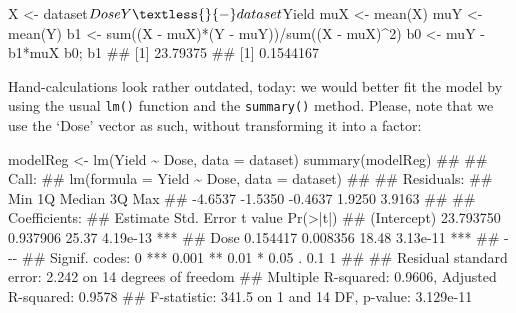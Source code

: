 \documentclass[a4paper,12pt,oneside]{book}
\newenvironment{Shaded}{\begin{snugshade}}{\end{snugshade}}
\newcommand{\DecValTok}[1]{#1}
\newcommand{\SpecialCharTok}[1]{#1}
\newcommand{\DocumentationTok}[1]{#1}
\newcommand{\OtherTok}[1]{#1}
\newcommand{\FunctionTok}[1]{#1}
\newcommand{\AttributeTok}[1]{#1}
\newcommand{\NormalTok}[1]{#1}
\begin{document}
\begin{Shaded}
\begin{Highlighting}[]
\NormalTok{X }\OtherTok{\textless{}{-}}\NormalTok{ dataset}\SpecialCharTok{$}\NormalTok{Dose}
\NormalTok{Y }\OtherTok{\textless{}{-}}\NormalTok{ dataset}\SpecialCharTok{$}\NormalTok{Yield}
\NormalTok{muX }\OtherTok{\textless{}{-}} \FunctionTok{mean}\NormalTok{(X)}
\NormalTok{muY }\OtherTok{\textless{}{-}} \FunctionTok{mean}\NormalTok{(Y)}
\NormalTok{b1 }\OtherTok{\textless{}{-}} \FunctionTok{sum}\NormalTok{((X }\SpecialCharTok{{-}}\NormalTok{ muX)}\SpecialCharTok{*}\NormalTok{(Y }\SpecialCharTok{{-}}\NormalTok{ muY))}\SpecialCharTok{/}\FunctionTok{sum}\NormalTok{((X }\SpecialCharTok{{-}}\NormalTok{ muX)}\SpecialCharTok{\^{}}\DecValTok{2}\NormalTok{)}
\NormalTok{b0 }\OtherTok{\textless{}{-}}\NormalTok{ muY }\SpecialCharTok{{-}}\NormalTok{ b1}\SpecialCharTok{*}\NormalTok{muX}
\NormalTok{b0; b1}
\DocumentationTok{\#\# [1] 23.79375}
\DocumentationTok{\#\# [1] 0.1544167}
\end{Highlighting}
\end{Shaded}

Hand-calculations look rather outdated, today: we would better fit the model by using the usual \texttt{lm()} function and the \texttt{summary()} method. Please, note that we use the `Dose' vector as such, without transforming it into a factor:

\begin{Shaded}
\begin{Highlighting}[]
\NormalTok{modelReg }\OtherTok{\textless{}{-}} \FunctionTok{lm}\NormalTok{(Yield }\SpecialCharTok{\textasciitilde{}}\NormalTok{ Dose, }\AttributeTok{data =}\NormalTok{ dataset)}
\FunctionTok{summary}\NormalTok{(modelReg)}
\DocumentationTok{\#\# }
\DocumentationTok{\#\# Call:}
\DocumentationTok{\#\# lm(formula = Yield \textasciitilde{} Dose, data = dataset)}
\DocumentationTok{\#\# }
\DocumentationTok{\#\# Residuals:}
\DocumentationTok{\#\#     Min      1Q  Median      3Q     Max }
\DocumentationTok{\#\# {-}4.6537 {-}1.5350 {-}0.4637  1.9250  3.9163 }
\DocumentationTok{\#\# }
\DocumentationTok{\#\# Coefficients:}
\DocumentationTok{\#\#              Estimate Std. Error t value Pr(\textgreater{}|t|)    }
\DocumentationTok{\#\# (Intercept) 23.793750   0.937906   25.37 4.19e{-}13 ***}
\DocumentationTok{\#\# Dose         0.154417   0.008356   18.48 3.13e{-}11 ***}
\DocumentationTok{\#\# {-}{-}{-}}
\DocumentationTok{\#\# Signif. codes:  0 \textquotesingle{}***\textquotesingle{} 0.001 \textquotesingle{}**\textquotesingle{} 0.01 \textquotesingle{}*\textquotesingle{} 0.05 \textquotesingle{}.\textquotesingle{} 0.1 \textquotesingle{} \textquotesingle{} 1}
\DocumentationTok{\#\# }
\DocumentationTok{\#\# Residual standard error: 2.242 on 14 degrees of freedom}
\DocumentationTok{\#\# Multiple R{-}squared:  0.9606, Adjusted R{-}squared:  0.9578 }
\DocumentationTok{\#\# F{-}statistic: 341.5 on 1 and 14 DF,  p{-}value: 3.129e{-}11}
\end{Highlighting}
\end{Shaded}
\end{document}
